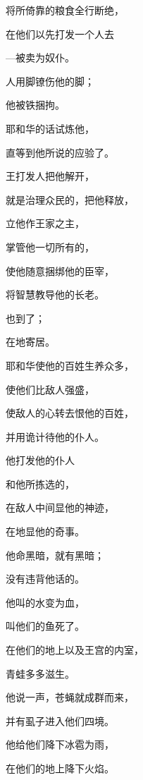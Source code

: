 {\par }{\Q 将所倚靠的粮食全行断绝，
\par }{\Q {}在他们以先打发一个人去
\par }{\Q —{}被卖为奴仆。
\par }{\Q {}人用脚镣伤他的脚；
\par }{\Q 他被铁{}捆拘。
\par }{\Q {}耶和华的话试炼他，
\par }{\Q 直等到他所说的应验了。
\par }{\Q {}王打发人把他解开，
\par }{\Q 就是治理众民的，把他释放，
\par }{\Q {}立他作王家之主，
\par }{\Q 掌管他一切所有的，
\par }{\Q {}使他随意捆绑他的臣宰，
\par }{\Q 将智慧教导他的长老。
\par }{\BB \par }{\Q {}也到了{}；
\par }{在{}地寄居。
\par }{\Q {}耶和华使他的百姓生养众多，
\par }{\Q 使他们比敌人强盛，
\par }{\Q {}使敌人的心转去恨他的百姓，
\par }{\Q 并用诡计待他的仆人。
\par }{\BB \par }{\Q {}他打发他的仆人{}
\par }{\Q 和他所拣选的{}，
\par }{\Q {}在敌人中间显他的神迹，
\par }{\Q 在{}地显他的奇事。
\par }{\Q {}他命黑暗，就有黑暗；
\par }{\Q 没有违背他话的。
\par }{\Q {}他叫{}的水变为血，
\par }{\Q 叫他们的鱼死了。
\par }{\Q {}在他们的地上以及王宫的内室，
\par }{\Q 青蛙多多滋生。
\par }{\Q {}他说一声，苍蝇就成群而来，
\par }{\Q 并有虱子进入他们四境。
\par }{\Q {}他给他们降下冰雹为雨，
\par }{\Q 在他们的地上降下火焰。
}
